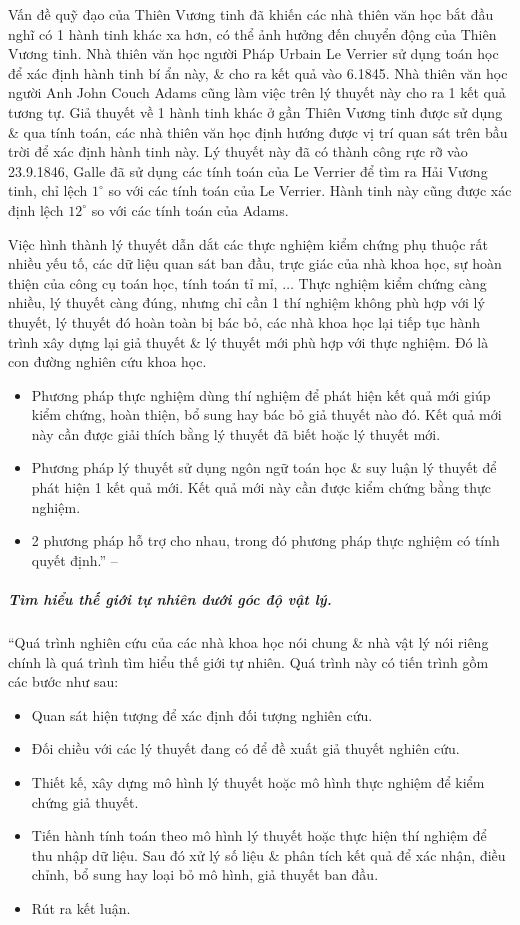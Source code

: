 \documentclass{article}
\numberwithin{equation}{section}
\begin{document}
Vấn đề quỹ đạo của Thiên Vương tinh đã khiến các nhà thiên văn học bắt đầu nghĩ có 1 hành tinh khác xa hơn, có thể ảnh hưởng đến chuyển động của Thiên Vương tinh. Nhà thiên văn học người Pháp Urbain Le Verrier sử dụng toán học để xác định hành tinh bí ẩn này, \& cho ra kết quả vào 6.1845. Nhà thiên văn học người Anh John Couch Adams cũng làm việc trên lý thuyết này cho ra 1 kết quả tương tự. Giả thuyết về 1 hành tinh khác ở gần Thiên Vương tinh được sử dụng \& qua tính toán, các nhà thiên văn học định hướng được vị trí quan sát trên bầu trời để xác định hành tinh này. Lý thuyết này đã có thành công rực rỡ vào 23.9.1846, Galle đã sử dụng các tính toán của Le Verrier để tìm ra Hải Vương tinh, chỉ lệch $1^\circ$ so với các tính toán của Le Verrier. Hành tinh này cũng được xác định lệch $12^\circ$ so với các tính toán của Adams.

Việc hình thành lý thuyết dẫn dắt các thực nghiệm kiểm chứng phụ thuộc rất nhiều yếu tố, các dữ liệu quan sát ban đầu, trực giác của nhà khoa học, sự hoàn thiện của công cụ toán học, tính toán tỉ mỉ, $\ldots$ Thực nghiệm kiểm chứng càng nhiều, lý thuyết càng đúng, nhưng chỉ cần 1 thí nghiệm không phù hợp với lý thuyết, lý thuyết đó hoàn toàn bị bác bỏ, các nhà khoa học lại tiếp tục hành trình xây dựng lại giả thuyết \& lý thuyết mới phù hợp với thực nghiệm. Đó là con đường nghiên cứu khoa học.
\begin{itemize}
	\item Phương pháp thực nghiệm dùng thí nghiệm để phát hiện kết quả mới giúp kiểm chứng, hoàn thiện, bổ sung hay bác bỏ giả thuyết nào đó. Kết quả mới này cần được giải thích bằng lý thuyết đã biết hoặc lý thuyết mới.
	\item Phương pháp lý thuyết sử dụng ngôn ngữ toán học \& suy luận lý thuyết để phát hiện 1 kết quả mới. Kết quả mới này cần được kiểm chứng bằng thực nghiệm.
	\item 2 phương pháp hỗ trợ cho nhau, trong đó phương pháp thực nghiệm có tính quyết định.'' -- \cite[pp. 7--8]{SGK_Vat_Ly_10_Chan_Troi_Sang_Tao}
\end{itemize}

\subparagraph{Tìm hiểu thế giới tự nhiên dưới góc độ vật lý.}
``Quá trình nghiên cứu của các nhà khoa học nói chung \& nhà vật lý nói riêng chính là quá trình tìm hiểu thế giới tự nhiên. Quá trình này có tiến trình gồm các bước như sau:
\begin{itemize}
	\item Quan sát hiện tượng để xác định đối tượng nghiên cứu.
	\item Đối chiều với các lý thuyết đang có để đề xuất giả thuyết nghiên cứu.
	\item Thiết kế, xây dựng mô hình lý thuyết hoặc mô hình thực nghiệm để kiểm chứng giả thuyết.
	\item Tiến hành tính toán theo mô hình lý thuyết hoặc thực hiện thí nghiệm để thu nhập dữ liệu. Sau đó xử lý số liệu \& phân tích kết quả để xác nhận, điều chỉnh, bổ sung hay loại bỏ mô hình, giả thuyết ban đầu.
	\item Rút ra kết luận.
\end{itemize}
\end{document}
